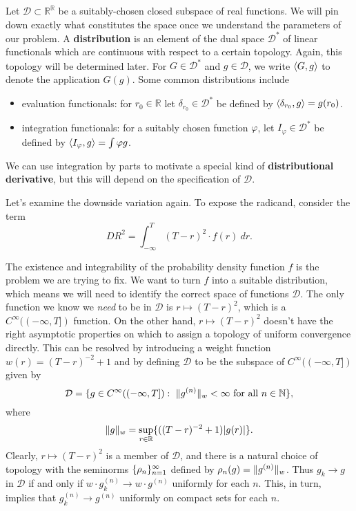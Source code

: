 \documentclass[12pt]{article}
\newcommand{\RR}{\mathbb{R}}
\newcommand{\NN}{\mathbb{N}}
\newcommand{\DD}{\mathcal{D}}
\DeclarePairedDelimiter{\ip}{\langle}{\rangle}
\DeclarePairedDelimiter{\norm}{\|}{\|}
\DeclarePairedDelimiter{\abs}{|}{|}
\DeclarePairedDelimiter{\set}{\{}{\}}
\begin{document}
Let $\DD \subset \RR^\RR$ be a suitably-chosen closed subspace of real
functions. We will pin down exactly what constitutes the space once we
understand the parameters of our problem. A \textbf{distribution} is an element
of the dual space $\DD^*$ of linear functionals which are continuous with
respect to a certain topology. Again, this topology will be determined later.
For $G \in \DD^*$ and $g \in \DD$, we write $\ip{G, g}$ to denote the
application $G(g)$. Some common distributions include
\begin{itemize}
  \item evaluation functionals: for $r_0 \in \RR$ let
    $\delta_{r_0} \in \DD^*$ be defined by $\ip{\delta_{r_0}, g} = g(r_0)$.
  \item integration functionals: for a suitably chosen function $\varphi$, let
    $I_\varphi \in \DD^*$ be defined by $\ip{I_\varphi, g} = \int \varphi g$.
\end{itemize}
We can use integration by parts to motivate a special kind of
\textbf{distributional derivative}, but this will depend on the specification of
$\DD$.

Let's examine the downside variation again. To expose the radicand, consider the
term
\begin{equation*}
  \textit{DR}^2 = \int_{-\infty}^{T} (T-r)^2 \cdot f(r) \ dr.
\end{equation*}

The existence and integrability of the probability density function $f$ is the
problem we are trying to fix. We want to turn $f$ into a suitable distribution,
which means we will need to identify the correct space of functions $\DD$. The
only function we know we \emph{need} to be in $\DD$ is $r \mapsto (T-r)^2$,
which is a $C^{\infty}( (-\infty,  T])$ function. On the other hand, $r \mapsto
(T-r)^2$ doesn't have the right asymptotic properties on which to assign a
topology of uniform convergence directly. This can be resolved by introducing a
weight function $w(r) = (T-r)^{-2}+1$ and by defining $\DD$ to be the subspace of
$C^{\infty}((-\infty, T])$ given by
\begin{equation*}
  \DD = \set{
    g \in C^{\infty}( (-\infty, T]) : 
    \text{
      $\norm{g^{(n)}}_{w} < \infty$ for all $n \in \NN$%
    }
  },
\end{equation*}
where
\begin{equation*}
  \norm{g}_w = \sup_{r \in \RR} \set{((T-r)^{-2}+1) \abs{g(r)}}.
\end{equation*}
Clearly, $r \mapsto (T-r)^2$ is a member of $\DD$, and there is a natural choice
of topology with the seminorms $\set{\rho_n}_{n = 1}^{\infty}$ defined by
$\rho_n(g) = \norm{g^{(n)}}_w$. Thus $g_k \to g$ in $\DD$ if and only if
$w \cdot g_k^{(n)} \to w\cdot g^{(n)}$ uniformly for each $n$. This, in turn,
implies that $g_k^{(n)} \to g^{(n)}$ uniformly on compact sets for each $n$.
\end{document}
